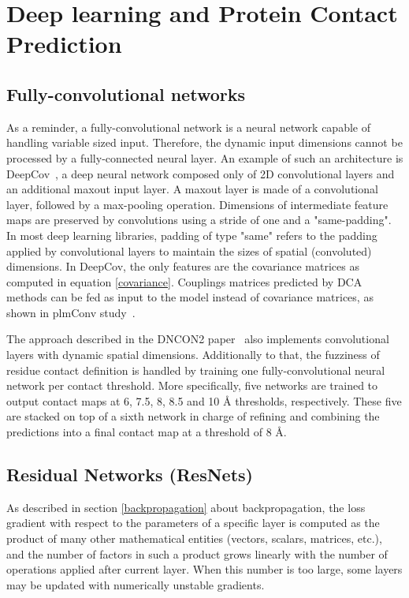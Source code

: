 \section{Deep learning and Protein Contact Prediction}

    \subsection{Fully-convolutional networks}

        As a reminder, a fully-convolutional network is a neural network capable
        of handling variable sized input. Therefore, the dynamic input dimensions
        cannot be processed by a fully-connected neural layer.
        An example of such an architecture is DeepCov~\cite{doi:10.1093/bioinformatics/bty341},
        a deep neural network composed only of 2D convolutional layers and an additional
        maxout input layer. A maxout layer is made of a convolutional layer, followed
        by a max-pooling operation. Dimensions of intermediate feature maps are preserved
        by convolutions using a stride of one and a "same-padding". In most deep learning
        libraries, padding of type "same" refers to the padding applied by convolutional layers
        to maintain the sizes of spatial (convoluted) dimensions.
        In DeepCov, the only features are the covariance matrices as computed
        in equation \ref{covariance}. Couplings matrices predicted by DCA methods can be fed as
        input to the model instead of covariance matrices, as shown in plmConv study~\cite{golkov2016protein}.

        The approach described in the DNCON2 paper~\cite{doi:10.1093/bioinformatics/bty341}
        also implements convolutional layers with dynamic spatial dimensions.
        Additionally to that, the fuzziness of residue contact definition is handled
        by training one fully-convolutional neural network per contact threshold.
        More specifically, five networks are trained to output contact maps at 6, 7.5, 8, 8.5 and 10 \AA{}
        thresholds, respectively. These five are stacked on top of a sixth network in charge
        of refining and combining the predictions into a final contact map at a threshold of 8 \AA{}.

    \subsection{Residual Networks (ResNets)}

        As described in section \ref{backpropagation} about backpropagation,
        the loss gradient with respect to the parameters of a specific layer
        is computed as the product of many other mathematical entities
        (vectors, scalars, matrices, etc.), and the number of factors in such
        a product grows linearly with the number of operations applied after
        current layer. When this number is too large, some layers may be
        updated with numerically unstable gradients.


